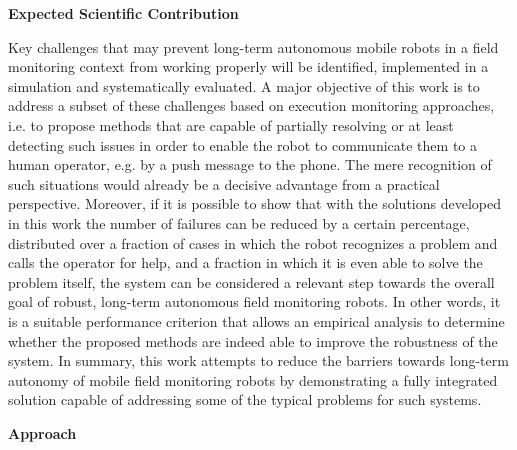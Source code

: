 \documentclass[english, master, utf8]{base/thesis_KBS}
\begin{document}
\textbf{Expected Scientific Contribution}\newline

Key challenges that may prevent long-term autonomous mobile robots in a field monitoring context from working properly will be identified, implemented 
in a simulation and systematically evaluated. A major objective of this work is to address a subset of these challenges based on execution monitoring approaches,
i.e. to propose methods that are capable of partially resolving or at least detecting such issues in order to enable the robot to communicate them to a human operator,
e.g. by a push message to the phone. The mere recognition of such situations would already be a decisive advantage from a practical perspective. Moreover, if it is possible
to show that with the solutions developed in this work the number of failures can be reduced by a certain percentage, distributed over a fraction of cases in which the robot 
recognizes a problem and calls the operator for help, and a fraction in which it is even able to solve the problem itself, the system can be considered a relevant step towards 
the overall goal of robust, long-term autonomous field monitoring robots. In other words, it is a suitable performance criterion that allows an empirical analysis to
determine whether the proposed methods are indeed able to improve the robustness of the system. In summary, this work attempts to reduce the barriers towards long-term
autonomy of mobile field monitoring robots by demonstrating a fully integrated solution capable of addressing some of the typical problems for such systems.\newline

\textbf{Approach}\newline
\end{document}
